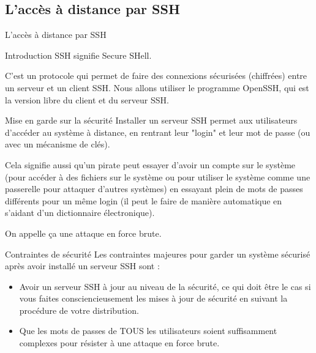 \documentclass[10pt]{beamer}
\begin{document}
\subsection{L'accès à distance par SSH}
\begin{frame}
\begin{center}
L'accès à distance par SSH
\end{center}
\end{frame}
\begin{frame}{Introduction}
	SSH signifie Secure SHell.
	\pause 


	C'est un protocole qui permet de faire des connexions sécurisées (chiffrées) entre un serveur et un client SSH. Nous allons utiliser le programme OpenSSH, qui est la version libre du client et du serveur SSH.
\end{frame}
\begin{frame}{Mise en garde sur la sécurité}
	Installer un serveur SSH permet aux utilisateurs d'accéder au système à distance,
	en rentrant leur "login" et leur mot de passe (ou avec un mécanisme de clés). 
	\pause


	Cela signifie aussi qu'un pirate peut essayer d'avoir un compte sur le système (pour accéder à des fichiers sur le système ou pour utiliser le système comme une passerelle pour attaquer d'autres systèmes) en essayant plein de mots de passes différents pour un même login (il peut le faire de manière automatique en s'aidant d'un dictionnaire électronique). 
	
	On appelle ça une attaque en force brute.

\end{frame}

\begin{frame}{Contraintes de sécurité}
Les contraintes majeures pour garder un système sécurisé après avoir installé un serveur SSH sont :
\begin{itemize}
\item Avoir un serveur SSH à jour au niveau de la sécurité, ce qui doit être le cas si vous faites consciencieusement les mises à jour de sécurité en suivant la procédure de votre distribution.
\item Que les mots de passes de TOUS les utilisateurs soient suffisamment complexes pour résister à une attaque en force brute.
\end{itemize}
\end{frame}
\end{document}
